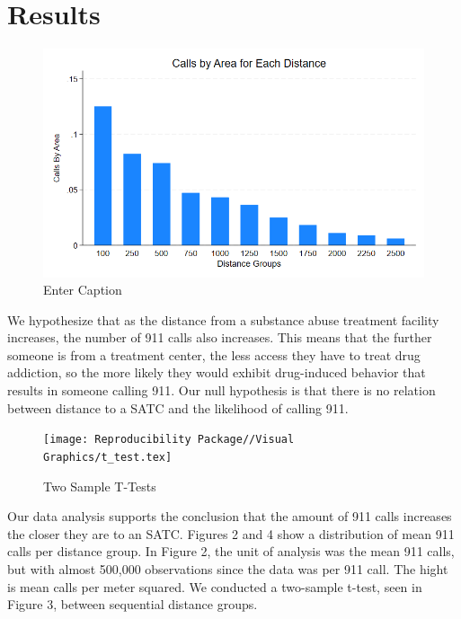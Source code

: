 \documentclass[12pt]{article}
\begin{document}

\section{Results}
\label{sec:result}

\begin{figure}[ht]
    \centering
    \includegraphics[width=1\linewidth]{Reproducibility Package//Visual Graphics/Avg_Calls_per_Distance_Group.png}
    \caption{Enter Caption}
    \label{fig: Average Number of Calls per Distance Group}
\end{figure}
We hypothesize that as the distance from a substance abuse treatment facility increases, the number of 911 calls also increases. This means that the further someone is from a treatment center, the less access they have to treat drug addiction, so the more likely they would exhibit drug-induced behavior that results in someone calling 911. Our null hypothesis is that there is no relation between distance to a SATC and the likelihood of calling 911. 
\begin{figure}[h]
    \centering
    \texttt{[image: Reproducibility Package//Visual Graphics/t\_test.tex]}
    \caption{Two Sample T-Tests}
    \label{fig:enter-label}
\end{figure}
Our data analysis supports the conclusion that the amount of 911 calls increases the closer they are to an SATC. Figures 2 and 4 show a distribution of mean 911 calls per distance group. In Figure 2, the unit of analysis was the mean 911 calls, but with almost 500,000 observations since the data was per 911 call. The hight is mean calls per meter squared. We conducted a two-sample t-test, seen in Figure 3, between sequential distance groups. 
\end{document}
